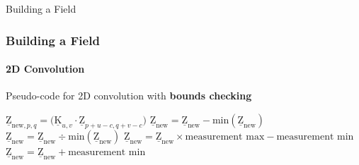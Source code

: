 \documentclass[professionalfont,10pt]{beamer}
\begin{document}
	\begin{frame}[t]{Building a Field}
		\frametitle{Building a Field}
		\framesubtitle{2D Convolution}
		\hskip-0.75cm
		\begin{minipage}[t]{0.2\linewidth}\vspace{-0.5cm}
			\tiny\tableofcontents[currentsection,currentsubsection,hideothersubsections,subsectionstyle=show/shaded]
		\end{minipage}
		\hfill%
		\begin{minipage}[t]{0.86\linewidth}\vspace{-0.5cm}
			\begin{flushleft}
				Pseudo-code for 2D convolution with \textbf{bounds checking}
				\begin{algorithm}[H]
					\begin{algorithmic}[1]
										\STATE $\underline{\text{Z}}_{\text{new},p,q} = \big(\underline{\text{K}}_{u,v} \cdot {\underline{\text{Z}}}_{p+u-c, q+v-c}\big)$
									\ENDIF
									\ENDIF
									\ENDFOR
								\ENDFOR
							\ENDFOR
						\ENDFOR
						\STATE $\underline{\text{Z}}_{\text{new}} = \underline{\text{Z}}_{\text{new}} - \text{min}(\underline{\text{Z}}_{\text{new}})$
						\STATE $\underline{\text{Z}}_{\text{new}} = \underline{\text{Z}}_{\text{new}} \div \text{min}(\underline{\text{Z}}_{\text{new}})$
						\STATE $\underline{\text{Z}}_{\text{new}} = \underline{\text{Z}}_{\text{new}} \times \text{measurement max} - \text{measurement min}$
						\STATE $\underline{\text{Z}}_{\text{new}} = \underline{\text{Z}}_{\text{new}} + \text{measurement min}$
					\end{algorithmic}
					\label{alg:seq}
				\end{algorithm}
			\end{flushleft}
		\end{minipage}
		\vfill%
	\end{frame}
	
\end{document}
